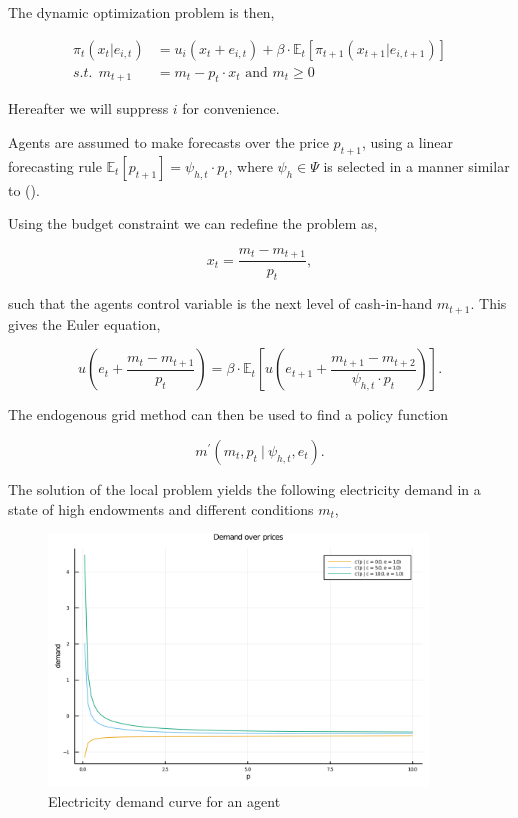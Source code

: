 \documentclass[american]{scrartcl}
\newcommand{\E}{\mathbb{E}}
\begin{document}
The dynamic optimization problem is then,

\begin{equation*}
    \begin{split}
        \pi_t(x_t \vert e_{i, t}) &= u_i(x_t + e_{i, t}) + \beta \cdot \E_t \left[ \pi_{t+1}(x_{t+1} \vert e_{i, t+1}) \right] \\
        s.t. \ \ m_{t+1} &= m_t - p_t \cdot x_t \text{ and } m_t \geq 0
    \end{split}
\end{equation*}

Hereafter we will suppress $i$ for convenience.

Agents are assumed to make forecasts over the price $p_{t+1}$, using a linear forecasting rule $\E_t[p_{t+1}] = \psi_{h, t} \cdot p_t$, where $\psi_h \in \Psi$ is selected in a manner similar to \citeauthor{Hommes2013} (\citeyear{Hommes2013}).

Using the budget constraint we can redefine the problem as,

\begin{equation}
    x_t = \frac{m_t - m_{t+1}}{p_t},
\end{equation}

such that the agents control variable is the next level of cash-in-hand $m_{t+1}$. This gives the Euler equation,

\begin{equation}
    u\left( e_t + \frac{m_t - m_{t+1}}{p_t} \right) = \beta \cdot \E_t \left[ u\left(e_{t+1} + \frac{m_{t+1} - m_{t+2}}{ \psi_{h, t} \cdot p_t} \right)  \right].
\end{equation}

The endogenous grid method can then be used to find a policy function

\begin{equation}
    m^\prime(m_t, p_t \ \vert \ \psi_{h, t}, e_t).
\end{equation}

The solution of the local problem yields the following electricity demand in a state of high endowments and different conditions $m_t$,

\begin{figure}[h]
    \caption{Electricity demand curve for an agent}
    \centering
    \includegraphics[width=0.9\textwidth]{../../plots/markets/pricedemand.png}
\end{figure}
\end{document}
